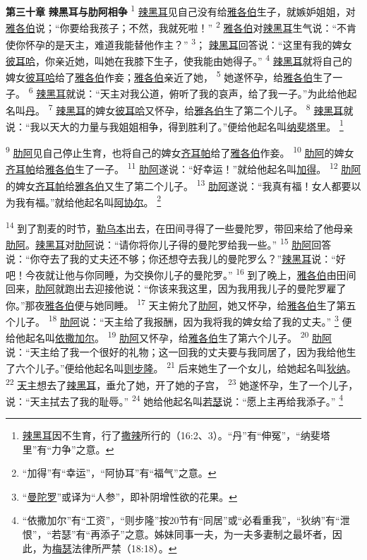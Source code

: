 \textbf{第三十章 }
\textbf{辣黑耳与肋阿相争 }
\textsuperscript{1}
\uline{辣黑耳}见自己没有给\uline{雅各伯}生子，就嫉妒姐姐，对\uline{雅各伯}说；“你要给我孩子；不然，我就死啦！”
\textsuperscript{2}
\uline{雅各伯}对\uline{辣黑耳}生气说：“不肯使你怀孕的是天主，难道我能替他作主？”
\textsuperscript{3}；
\uline{辣黑耳}回答说：“这里有我的婢女\uline{彼耳哈}，你亲近她，叫她在我膝下生子，使我能由她得子。”
\textsuperscript{4}
\uline{辣黑耳}就将自己的婢女\uline{彼耳哈}给了\uline{雅各伯}作妾；\uline{雅各伯}亲近了她，
\textsuperscript{5}
她遂怀孕，给\uline{雅各伯}生了一子。
\textsuperscript{6}
\uline{辣黑耳}就说：“天主对我公道，俯听了我的哀声，给了我一子。”为此给他起名叫\uline{丹}。
\textsuperscript{7}
\uline{辣黑耳}的婢女\uline{彼耳哈}又怀孕，给\uline{雅各伯}生了第二个儿子。
\textsuperscript{8}
\uline{辣黑耳}就说：“我以天大的力量与我姐姐相争，得到胜利了。”便给他起名叫\uline{纳斐塔里}。
\footnote{\uline{辣黑耳}因不生育，行了\uline{撒辣}所行的（16:2、3）。“丹”有“伸冤”，“纳斐塔里”有“力争”之意。}

\textsuperscript{9}
\uline{肋阿}见自己停止生育，也将自己的婢女\uline{齐耳帕}给了\uline{雅各伯}作妾。
\textsuperscript{10}
\uline{肋阿}的婢女\uline{齐耳帕}给\uline{雅各伯}生了一子。
\textsuperscript{11}
\uline{肋阿}遂说：“好幸运！”就给他起名叫\uline{加得}。
\textsuperscript{12}
\uline{肋阿}的婢女\uline{齐耳帕}给\uline{雅各伯}又生了第二个儿子。
\textsuperscript{13}
\uline{肋阿}遂说：“我真有福！女人都要以为我有福。”就给他起名叫\uline{阿协尔}。
\footnote{“加得”有“幸运”，“阿协耳”有“福气”之意。}

\textsuperscript{14}
到了割麦的时节，\uline{勒乌本}出去，在田间寻得了一些曼陀罗，带回来给了他母亲\uline{肋阿}。\uline{辣黑耳}对\uline{肋阿}说：“请你将你儿子得的曼陀罗给我一些。”
\textsuperscript{15}
\uline{肋阿}回答说：“你夺去了我的丈夫还不够；你还想夺去我儿的曼陀罗么？”\uline{辣黑耳}说：“好吧！今夜就让他与你同睡，为交换你儿子的曼陀罗。”
\textsuperscript{16}
到了晚上，\uline{雅各伯}由田间回来，\uline{肋阿}就跑出去迎接他说：“你该来我这里，因为我用我儿子的曼陀罗雇了你。”那夜\uline{雅各伯}便与她同睡。
\textsuperscript{17}
天主俯允了\uline{肋阿}，她又怀孕，给\uline{雅各伯}生了第五个儿子。
\textsuperscript{18}
\uline{肋阿}说：“天主给了我报酬，因为我将我的婢女给了我的丈夫。”
\footnote{“\uline{曼陀罗}”或译为“人参”，即补阴增性欲的花果。}
便给他起名叫\uline{依撒}\uline{加尔}。
\textsuperscript{19}
\uline{肋阿}又怀孕，给\uline{雅各伯}生了第六个儿子。
\textsuperscript{20}
\uline{肋阿}说：“天主给了我一个很好的礼物；这一回我的丈夫要与我同居了，因为我给他生了六个儿子。”便给他起名叫\uline{则步隆}。
\textsuperscript{21}
后来她生了一个女儿，给她起名叫\uline{狄纳}。
\textsuperscript{22}
\uline{天主}想去了\uline{辣黑耳}，垂允了她，开了她的子宫，
\textsuperscript{23}
她遂怀孕，生了一个儿子，说：“天主拭去了我的耻辱。”
\textsuperscript{24}
她给他起名叫\uline{若瑟}说：“愿上主再给我添子。”
\footnote{“依撒加尔”有“工资”，“则步隆”按20节有“同居”或“必看重我”，“狄纳”有“泄恨”，“若瑟”有“再添子”之意。姊妹同事一夫，为一夫多妻制之最坏者，因此，为\uline{梅瑟}法律所严禁（18:18）。}


